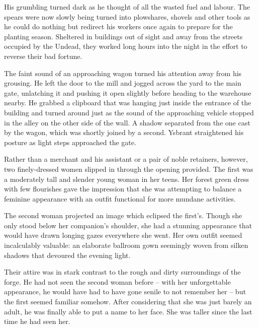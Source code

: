  

His grumbling turned dark as he thought of all the wasted fuel and labour. The spears were now slowly being turned into plowshares, shovels and other tools as he could do nothing but redirect his workers once again to prepare for the planting season. Sheltered in buildings out of sight and away from the streets occupied by the Undead, they worked long hours into the night in the effort to reverse their bad fortune.

 

The faint sound of an approaching wagon turned his attention away from his grousing. He left the door to the mill and jogged across the yard to the main gate, unlatching it and pushing it open slightly before heading to the warehouse nearby. He grabbed a clipboard that was hanging just inside the entrance of the building and turned around just as the sound of the approaching vehicle stopped in the alley on the other side of the wall. A shadow separated from the one cast by the wagon, which was shortly joined by a second. Ysbrant straightened his posture as light steps approached the gate.

 

Rather than a merchant and his assistant or a pair of noble retainers, however, two finely-dressed women slipped in through the opening provided. The first was a moderately tall and slender young woman in her teens. Her forest green dress with few flourishes gave the impression that she was attempting to balance a feminine appearance with an outfit functional for more mundane activities.

 

The second woman projected an image which eclipsed the first’s. Though she only stood below her companion’s shoulder, she had a stunning appearance that would have drawn longing gazes everywhere she went. Her own outfit seemed incalculably valuable: an elaborate ballroom gown seemingly woven from silken shadows that devoured the evening light.

 

Their attire was in stark contrast to the rough and dirty surroundings of the forge. He had not seen the second woman before – with her unforgettable appearance, he would have had to have gone senile to not remember her – but the first seemed familiar somehow. After considering that she was just barely an adult, he was finally able to put a name to her face. She was taller since the last time he had seen her.

 

